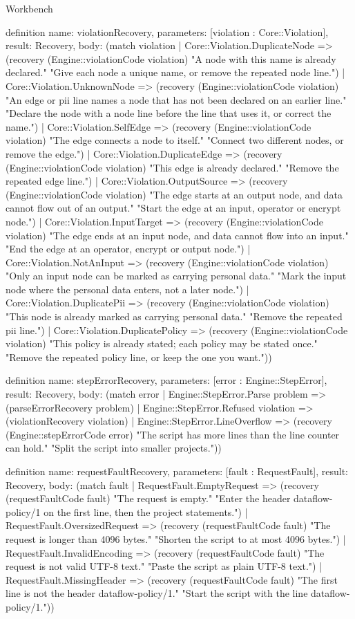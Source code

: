 \begin{lexlean}{Workbench}
\begin{semanticmodule}
definition{
  name: violationRecovery,
  parameters: [violation : Core::Violation],
  result: Recovery,
  body: (match violation
    | Core::Violation.DuplicateNode => (recovery (Engine::violationCode violation) "A node with this name is already declared." "Give each node a unique name, or remove the repeated node line.")
    | Core::Violation.UnknownNode => (recovery (Engine::violationCode violation) "An edge or pii line names a node that has not been declared on an earlier line." "Declare the node with a node line before the line that uses it, or correct the name.")
    | Core::Violation.SelfEdge => (recovery (Engine::violationCode violation) "The edge connects a node to itself." "Connect two different nodes, or remove the edge.")
    | Core::Violation.DuplicateEdge => (recovery (Engine::violationCode violation) "This edge is already declared." "Remove the repeated edge line.")
    | Core::Violation.OutputSource => (recovery (Engine::violationCode violation) "The edge starts at an output node, and data cannot flow out of an output." "Start the edge at an input, operator or encrypt node.")
    | Core::Violation.InputTarget => (recovery (Engine::violationCode violation) "The edge ends at an input node, and data cannot flow into an input." "End the edge at an operator, encrypt or output node.")
    | Core::Violation.NotAnInput => (recovery (Engine::violationCode violation) "Only an input node can be marked as carrying personal data." "Mark the input node where the personal data enters, not a later node.")
    | Core::Violation.DuplicatePii => (recovery (Engine::violationCode violation) "This node is already marked as carrying personal data." "Remove the repeated pii line.")
    | Core::Violation.DuplicatePolicy => (recovery (Engine::violationCode violation) "This policy is already stated; each policy may be stated once." "Remove the repeated policy line, or keep the one you want."))
}

definition{
  name: stepErrorRecovery,
  parameters: [error : Engine::StepError],
  result: Recovery,
  body: (match error
    | Engine::StepError.Parse problem => (parseErrorRecovery problem)
    | Engine::StepError.Refused violation => (violationRecovery violation)
    | Engine::StepError.LineOverflow => (recovery (Engine::stepErrorCode error) "The script has more lines than the line counter can hold." "Split the script into smaller projects."))
}

definition{
  name: requestFaultRecovery,
  parameters: [fault : RequestFault],
  result: Recovery,
  body: (match fault
    | RequestFault.EmptyRequest => (recovery (requestFaultCode fault) "The request is empty." "Enter the header dataflow-policy/1 on the first line, then the project statements.")
    | RequestFault.OversizedRequest => (recovery (requestFaultCode fault) "The request is longer than 4096 bytes." "Shorten the script to at most 4096 bytes.")
    | RequestFault.InvalidEncoding => (recovery (requestFaultCode fault) "The request is not valid UTF-8 text." "Paste the script as plain UTF-8 text.")
    | RequestFault.MissingHeader => (recovery (requestFaultCode fault) "The first line is not the header dataflow-policy/1." "Start the script with the line dataflow-policy/1."))
}


\end{semanticmodule}
\end{lexlean}
